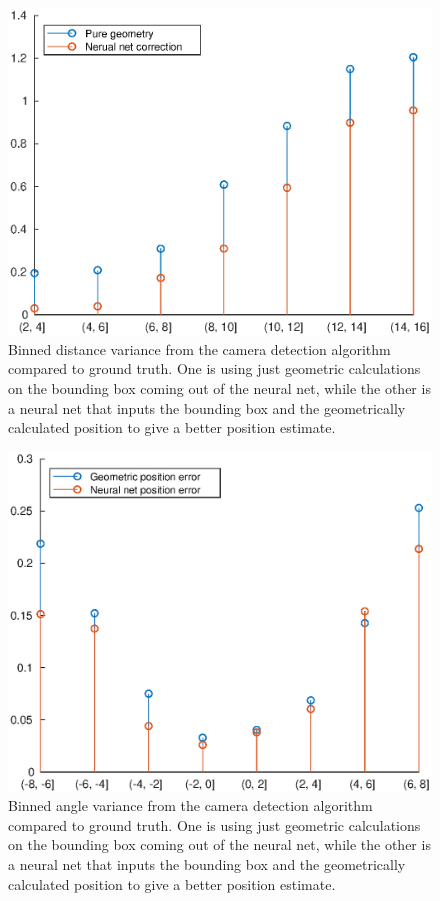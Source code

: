 \begin{figure}
    \centering
    \includegraphics[width=0.5\linewidth]{0_Images/3_Theory/camDetection/rVarCamera.eps}
    \caption[Binned distance variance from the camera detection algorithm.]
    {Binned distance variance from the camera detection algorithm compared to ground truth. One is using just geometric calculations on the bounding box coming out of the neural net, while the other is a neural net that inputs the bounding box and the geometrically calculated position to give a better position estimate.}
    \label{Fig:CameraRVariance}
\end{figure}

\begin{figure}
    \centering
    \includegraphics[width=0.5\linewidth]{0_Images/3_Theory/camDetection/psiVarCamera.eps}
    \caption[Binned angle variance from the camera detection algorithm.]
    {Binned angle variance from the camera detection algorithm compared to ground truth. One is using just geometric calculations on the bounding box coming out of the neural net, while the other is a neural net that inputs the bounding box and the geometrically calculated position to give a better position estimate.}
    \label{Fig:CameraPsiVariance}
\end{figure}

